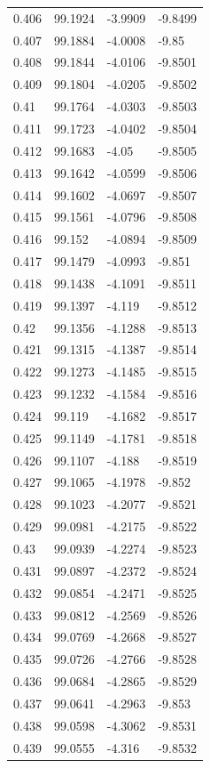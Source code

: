 \begin{tabular}{llll}
0.406 & 99.1924 & -3.9909 & -9.8499 \\
0.407 & 99.1884 & -4.0008 & -9.85 \\
0.408 & 99.1844 & -4.0106 & -9.8501 \\
0.409 & 99.1804 & -4.0205 & -9.8502 \\
0.41 & 99.1764 & -4.0303 & -9.8503 \\
0.411 & 99.1723 & -4.0402 & -9.8504 \\
0.412 & 99.1683 & -4.05 & -9.8505 \\
0.413 & 99.1642 & -4.0599 & -9.8506 \\
0.414 & 99.1602 & -4.0697 & -9.8507 \\
0.415 & 99.1561 & -4.0796 & -9.8508 \\
0.416 & 99.152 & -4.0894 & -9.8509 \\
0.417 & 99.1479 & -4.0993 & -9.851 \\
0.418 & 99.1438 & -4.1091 & -9.8511 \\
0.419 & 99.1397 & -4.119 & -9.8512 \\
0.42 & 99.1356 & -4.1288 & -9.8513 \\
0.421 & 99.1315 & -4.1387 & -9.8514 \\
0.422 & 99.1273 & -4.1485 & -9.8515 \\
0.423 & 99.1232 & -4.1584 & -9.8516 \\
0.424 & 99.119 & -4.1682 & -9.8517 \\
0.425 & 99.1149 & -4.1781 & -9.8518 \\
0.426 & 99.1107 & -4.188 & -9.8519 \\
0.427 & 99.1065 & -4.1978 & -9.852 \\
0.428 & 99.1023 & -4.2077 & -9.8521 \\
0.429 & 99.0981 & -4.2175 & -9.8522 \\
0.43 & 99.0939 & -4.2274 & -9.8523 \\
0.431 & 99.0897 & -4.2372 & -9.8524 \\
0.432 & 99.0854 & -4.2471 & -9.8525 \\
0.433 & 99.0812 & -4.2569 & -9.8526 \\
0.434 & 99.0769 & -4.2668 & -9.8527 \\
0.435 & 99.0726 & -4.2766 & -9.8528 \\
0.436 & 99.0684 & -4.2865 & -9.8529 \\
0.437 & 99.0641 & -4.2963 & -9.853 \\
0.438 & 99.0598 & -4.3062 & -9.8531 \\
0.439 & 99.0555 & -4.316 & -9.8532 \\

\end{tabular}
